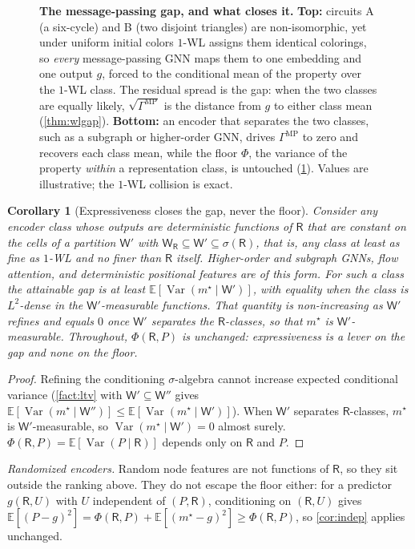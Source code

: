 \documentclass[10pt]{article}
\newtheorem{corollary}{Corollary}
\newcommand{\E}{\mathbb{E}}
\newcommand{\Var}{\operatorname{Var}}
\newcommand{\R}{\mathsf{R}}
\newcommand{\W}{\mathsf{W}}
\newcommand{\panellab}[1]{{\sffamily\bfseries #1}}
\begin{document}
\begin{figure}[t]
{\begin{tikzpicture}[font=\sffamily, line cap=round, line join=round]
\end{tikzpicture}%
}
\caption{\textbf{The message-passing gap, and what closes it.}
\panellab{Top:} circuits A (a six-cycle) and B (two disjoint triangles) are
non-isomorphic, yet under uniform initial colors $1$-WL assigns them identical colorings,
so \emph{every} message-passing GNN maps them to one embedding and one output $g$, forced
to the conditional mean of the property over the $1$-WL class. The residual spread is the
gap: when the two classes are equally likely, $\sqrt{\Gamma^{\mathrm{MP}}}$ is the distance
from $g$ to either class mean (\cref{thm:wlgap}).
\panellab{Bottom:} an encoder that separates the two classes, such as a subgraph or
higher-order GNN, drives $\Gamma^{\mathrm{MP}}$ to zero and recovers each class mean, while
the floor $\Phi$, the variance of the property \emph{within} a representation class, is
untouched (\cref{cor:mono}). Values are illustrative; the $1$-WL collision is exact.}
\label{fig:wlgap}
\end{figure}

\begin{corollary}[Expressiveness closes the gap, never the floor]
\label{cor:mono}
Consider any encoder class whose outputs are deterministic functions of $\R$ that are constant on the cells of a partition $\W'$ with $\W_\R\subseteq\W'\subseteq\sigma(\R)$, that is, any class at least as fine as $1$-WL and no finer than $\R$ itself. Higher-order and subgraph GNNs, flow attention, and deterministic positional features are of this form. For such a class the attainable gap is at least $\E[\Var(m^\star\mid\W')]$, with equality when the class is $L^2$-dense in the $\W'$-measurable functions. That quantity is non-increasing as $\W'$ refines and equals $0$ once $\W'$ separates the $\R$-classes, so that $m^\star$ is $\W'$-measurable. Throughout, $\Phi(\R,P)$ is unchanged: expressiveness is a lever on the gap and none on the floor.
\end{corollary}

\begin{proof}
Refining the conditioning $\sigma$-algebra cannot increase expected conditional variance (\cref{fact:ltv} with $\W'\subseteq\W''$ gives $\E[\Var(m^\star\mid\W'')]\le\E[\Var(m^\star\mid\W')]$). When $\W'$ separates $\R$-classes, $m^\star$ is $\W'$-measurable, so $\Var(m^\star\mid\W')=0$ almost surely. $\Phi(\R,P)=\E[\Var(P\mid\R)]$ depends only on $\R$ and $P$.
\end{proof}

\noindent\emph{Randomized encoders.} Random node features \citep{sato2021random} are not functions of $\R$, so they sit outside the ranking above. They do not escape the floor either: for a predictor $g(\R,U)$ with $U$ independent of $(P,\R)$, conditioning on $(\R,U)$ gives $\E[(P-g)^2]=\Phi(\R,P)+\E[(m^\star-g)^2]\ge\Phi(\R,P)$, so \cref{cor:indep} applies unchanged.
\end{document}
